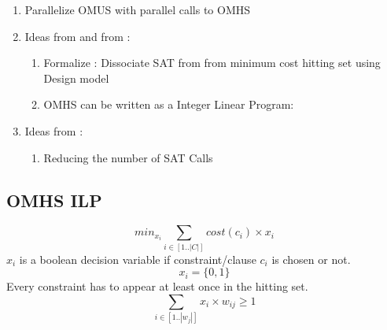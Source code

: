 \documentclass{article}
\newcommand\m[1]{\mathcal{#1}}
\begin{document}

\begin{enumerate}
  \item Parallelize OMUS with parallel calls to OMHS
  \item Ideas from \cite{davies2011solving} and from \cite{de2014future}:
  \begin{enumerate}
    \item Formalize : Dissociate SAT from from minimum cost hitting set using Design model
    \item OMHS can be written as a Integer Linear Program:
  \end{enumerate}

  \item Ideas from \cite{ignatiev2015smallest}:
  \begin{enumerate}
    \item Reducing the number of SAT Calls
  \end{enumerate}
\end{enumerate}
\newpage
\subsection*{OMHS ILP}

\begin{equation} \label{eq:ILP:objective}
  min_{x_i} \sum_{i \in [1..|C|]} cost(c_i) \times x_i
\end{equation}
$x_i$ is a boolean decision variable if constraint/clause $c_i$ is chosen or not.
\begin{equation} \label{eq:ILP:bool}
  x_i = \{0,1\}
\end{equation}
Every constraint has to appear at least once in the hitting set.  
\begin{equation} \label{eq:ILP:}
  \sum_{i \in [1..|w_j|]} x_i \times w_{ij} \geq 1
\end{equation}

\newpage

\end{document}
